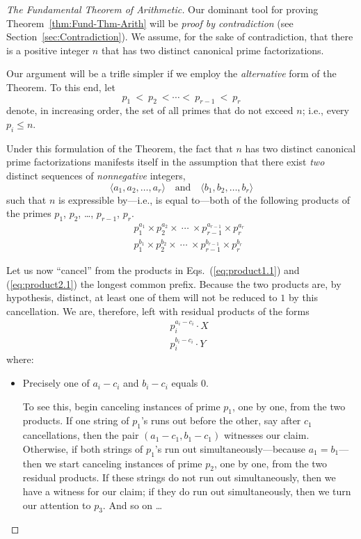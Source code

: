 \begin{proof}[The Fundamental Theorem of Arithmetic]
Our dominant tool for proving Theorem~\ref{thm:Fund-Thm-Arith} will be {\em proof by contradiction} (see Section~\ref{sec:Contradiction}).  We assume, for the sake of contradiction, that there is a positive integer $n$ that has two distinct canonical prime factorizations.

Our argument will be a trifle simpler if we employ the {\em alternative} form of the Theorem.  To this end, let
\[ p_1 \ < \ p_2 \ < \cdots < \ p_{r-1} \ < \ p_r \]
denote, in increasing order, the set of all primes that do not exceed $n$; i.e., every $p_i \leq n$.

\smallskip

Under this formulation of the Theorem, the fact that $n$ has two distinct canonical prime factorizations manifests itself in the assumption that there exist {\em two} distinct sequences of {\em nonnegative} integers, 
\[ \langle a_1, a_2, \ldots, a_r \rangle \ \ \ \mbox{ and } \ \ \
\langle b_1, b_2, \ldots, b_r \rangle 
\]
such that $n$ is expressible by---i.e., is equal to---both of the following products of the primes $p_1$, $p_2$, \ldots, $p_{r-1}$, $p_r$.
\begin{eqnarray}
 & & 
\label{eq:product1.1}
p_1^{a_1} \times p_2^{a_2} \times \ \cdots \ \times p_{r-1}^{a_{r-1}} \times p_r^{a_r} \\
 & &
\label{eq:product2.1}
p_1^{b_1} \times p_2^{b_2} \times \ \cdots \ \times p_{r-1}^{b_{r-1}} \times p_r^{b_r}
\end{eqnarray}

\smallskip

Let us now ``cancel'' from the products in Eqs.~(\ref{eq:product1.1}) and (\ref{eq:product2.1}) the longest common prefix.  Because the two products are, by hypothesis, distinct, at least one of them will not be reduced to $1$ by this cancellation.  We are, therefore, left with residual products of the forms
\begin{eqnarray}
 & &
\label{eq:product1.2}
p_i^{a_i -c_i} \cdot X \\
 & &
\label{eq:product2.2}
p_i^{b_i -c_i} \cdot Y
\end{eqnarray}
where:
\begin{itemize}
\item
Precisely one of $a_i -c_i$ and $b_i -c_i$ equals $0$.

\smallskip

To see this, begin canceling instances of prime $p_1$, one by one, from the two products.  If one string of $p_1$'s runs out before the other, say after $c_1$ cancellations, then the pair $(a_1 -c_1, b_1 -c_1)$ witnesses our claim.  Otherwise, if both strings of $p_1$'s run out simultaneously---because $a_1 = b_1$---then we start canceling instances of prime $p_2$, one by one, from the two residual products.  If these strings do not run out simultaneously, then we have a witness for our claim; if they do run out simultaneously, then we turn our attention to $p_3$.  And so on \ldots


\end{itemize}
\end{proof}

